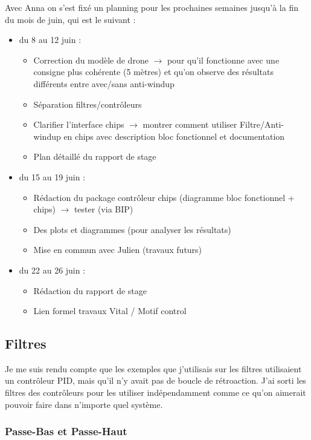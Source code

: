 \documentclass{article}
\begin{document}
Avec Anna on s'est fixé un planning pour les prochaines semaines jusqu'à la fin du mois de juin, qui est le suivant :
\begin{itemize}
    \item du 8 au 12 juin : 
    \begin{itemize}
        \item Correction du modèle de drone $\rightarrow$ pour qu'il fonctionne avec une consigne plus cohérente (5 mètres) et qu'on observe des résultats différents entre avec/sans anti-windup
        \item Séparation filtres/contrôleurs
        \item Clarifier l'interface chips $\rightarrow$ montrer comment utiliser Filtre/Anti-windup en chips avec description bloc fonctionnel et documentation
        \item Plan détaillé du rapport de stage
    \end{itemize}
    \item du 15 au 19 juin :
    \begin{itemize}
        \item Rédaction du package contrôleur chips (diagramme bloc fonctionnel + chips) $\rightarrow$ tester (via BIP)
        \item Des plots et diagrammes (pour analyser les résultats)
        \item Mise en commun avec Julien (travaux futurs)
    \end{itemize}
    \item du 22 au 26 juin :
    \begin{itemize}
        \item Rédaction du rapport de stage
        \item Lien formel travaux Vital / Motif control
    \end{itemize}
\end{itemize}

\subsection{Filtres}

Je me suis rendu compte que les exemples que j'utilisais sur les filtres utilisaient un contrôleur PID, mais qu'il 
n'y avait pas de boucle de rétroaction.
J'ai sorti les filtres des contrôleurs pour les utiliser indépendamment comme ce qu'on aimerait pouvoir faire dans 
n'importe quel système.

\subsubsection{Passe-Bas et Passe-Haut}
\end{document}
